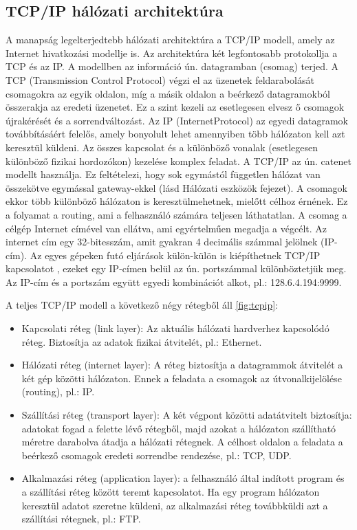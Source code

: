 \documentclass[12pt]{article}
\theoremstyle{plain}
\begin{document}
\subsection {TCP/IP hálózati architektúra}
A manapság legelterjedtebb hálózati architektúra a TCP/IP modell, amely az Internet hivatkozási modellje is. Az architektúra két legfontosabb protokollja a TCP és az IP. A modellben az információ ún. datagramban (csomag) terjed. A TCP (Transmission Control Protocol) végzi el az üzenetek feldarabolását csomagokra az egyik oldalon, míg a másik oldalon a beérkező datagramokból összerakja az eredeti üzenetet. Ez a szint kezeli az esetlegesen elvesz ő csomagok újrakérését és a sorrendváltozást. Az IP (InternetProtocol) az egyedi datagramok továbbításáért felelős, amely bonyolult lehet amennyiben több hálózaton kell azt keresztül küldeni. Az összes kapcsolat és a különböző vonalak (esetlegesen különböző fizikai hordozókon) kezelése komplex feladat.
A TCP/IP az ún. catenet modellt használja. Ez feltételezi, hogy sok egymástól független hálózat van összekötve egymással gateway-ekkel (lásd Hálózati eszközök fejezet). A csomagok ekkor több különböző hálózaton is keresztülmehetnek, mielőtt célhoz érnének. Ez a folyamat a routing, ami a felhasználó számára teljesen láthatatlan. A csomag a célgép Internet címével van ellátva, ami egyértelműen megadja a végcélt. Az internet cím egy 32-bitesszám, amit gyakran 4 decimális számmal jelölnek (IP-cím).  Az egyes gépeken futó eljárások külön-külön is kiépíthetnek TCP/IP kapcsolatot , ezeket egy IP-címen belül az ún. portszámmal különböztetjük meg. Az IP-cím és a portszám együtt egyedi kombinációt alkot, pl.: 128.6.4.194:9999. 
\\ \par
A teljes TCP/IP modell a következő négy rétegből áll \ref{fig:tcpip}:
\begin{itemize}
\item Kapcsolati réteg (link layer): Az aktuális hálózati hardverhez kapcsolódó réteg. Biztosítja az adatok fizikai átvitelét, pl.: Ethernet.
\item Hálózati réteg (internet layer): A réteg biztosítja a datagrammok átvitelét a két gép közötti hálózaton. Ennek a feladata a csomagok az útvonalkijelölése (routing), pl.: IP.
\item Szállítási réteg (transport layer): A két végpont közötti adatátvitelt biztosítja: adatokat fogad a felette lévő rétegből, majd azokat a hálózaton szállítható méretre darabolva átadja a hálózati rétegnek. A célhost oldalon a feladata a beérkező csomagok eredeti sorrendbe rendezése, pl.: TCP, UDP.
\item Alkalmazási réteg (application layer): a felhasználó által indított program és a szállítási réteg között teremt kapcsolatot. Ha egy program hálózaton keresztül adatot szeretne küldeni, az alkalmazási réteg továbbküldi azt a szállítási rétegnek, pl.: FTP.
\end{itemize}
\end{document}
